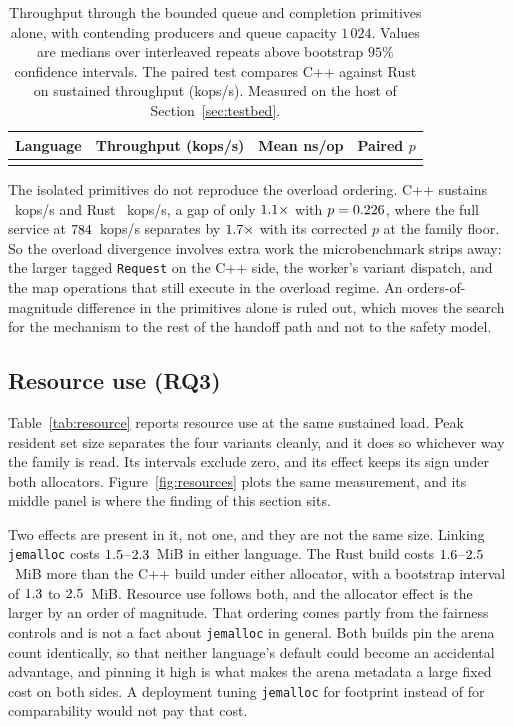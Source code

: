 \documentclass[english,oneside,a4paper,censored,csm,software-track-2020]{HYthesisML}
\begin{document}
\begin{table}[tp]
\centering
\small
\caption[Throughput through the contended synchronisation primitives alone]{Throughput through
the bounded queue and completion primitives alone, with \ContentionProducers{} contending producers
and queue capacity $1\,024$. Values are medians over \ContentionRepeats{} interleaved repeats above
bootstrap $95\%$ confidence intervals. The paired test compares C++ against Rust on sustained
throughput (kops/s). Measured on the host of Section~\ref{sec:testbed}.\label{tab:contention}}
\begin{tabular}{@{}l r r r@{}}
\hline\hline
Language & Throughput (kops/s) & Mean ns/op & Paired $p$ \\
\hline
\\
\hline
\end{tabular}
\end{table}

The isolated primitives do not reproduce the overload ordering. C++ sustains
\ContentionThrCpp{}~kops/s and Rust \ContentionThrRust{}~kops/s, a gap of only
$1.1\times$ with $p = 0.226$, where the full service at
$784$~kops/s separates by $1.7\times$ with its corrected $p$ at the
family floor. So the overload divergence involves extra work the microbenchmark strips away: the
larger tagged \texttt{Request} on the C++ side, the worker's variant dispatch, and the map
operations that still execute in the overload regime. An orders-of-magnitude difference in the
primitives alone is ruled out, which moves the search for the mechanism to the rest of the handoff
path and not to the safety model.

\subsection{Resource use (RQ3)}\label{sec:resources}
Table~\ref{tab:resource} reports resource use at the same
sustained load. Peak resident set size separates the four variants cleanly, and it does so
whichever way the family is read. Its intervals exclude zero, and its effect keeps its sign under
both allocators. Figure~\ref{fig:resources} plots the same measurement, and its middle panel is
where the finding of this section sits.

Two effects are present in it, not one, and they are not the same size. Linking
\texttt{jemalloc} costs $1.5$--$2.3$~MiB in either language. The Rust
build costs $1.6$--$2.5$~MiB more than the C++ build under either allocator,
with a bootstrap interval of $1.3$ to $2.5$~MiB. Resource use follows both, and
the allocator effect is the larger by an order of magnitude. That ordering comes partly from the
fairness controls and is not a fact about \texttt{jemalloc} in general. Both builds pin the arena
count identically, so that neither language's default could become an accidental advantage, and
pinning it high is what makes the arena metadata a large fixed cost on both sides. A deployment
tuning \texttt{jemalloc} for footprint instead of for comparability would not pay that cost.
\end{document}
